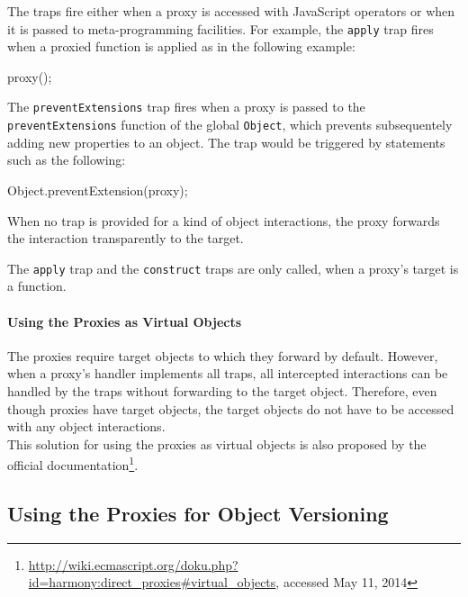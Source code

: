 The traps fire either when a proxy is accessed with JavaScript operators or when it is passed to meta-programming facilities.
For example, the \lstinline{apply} trap fires when a proxied function is applied as in the following example:

\begin{code}{}{}
proxy();
\end{code}
\iffalse
\end{verbatim}\fi
The \lstinline{preventExtensions} trap fires when a proxy is passed to the \lstinline{preventExtensions} function of the global \lstinline{Object}, which prevents subsequentely adding new properties to an object.
The trap would be triggered by statements such as the following:

\begin{code}{}{}
Object.preventExtension(proxy);
\end{code}
\iffalse
\end{verbatim}\fi

When no trap is provided for a kind of object interactions, the proxy forwards the interaction transparently to the target.

The \lstinline{apply} trap and the \lstinline{construct} traps are only called, when a proxy's target is a function.

\paragraph{Using the Proxies as Virtual Objects}
The proxies require target objects to which they forward by default.
However, when a proxy's handler implements all traps, all intercepted interactions can be handled by the traps without forwarding to the target object.
Therefore, even though proxies have target objects, the target objects do not have to be accessed with any object interactions.
\\
This solution for using the proxies as virtual objects is also proposed by the official documentation\footnote{\url{http://wiki.ecmascript.org/doku.php?id=harmony:direct\_proxies\#virtual_objects}, accessed May 11, 2014}.



\subsection{Using the Proxies for Object Versioning} \label{subsec:IMPLEMENTATION:1.2}

